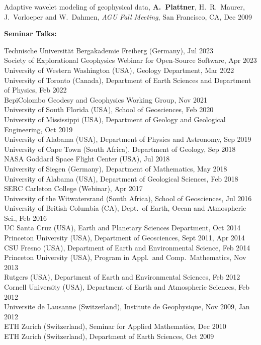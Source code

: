 \documentclass[10pt]{article}
\begin{document}
\spcp
Adaptive wavelet modeling of geophysical data,
\textbf{A.~Plattner}, H.~R.~Maurer, J.~Vorloeper and W.~Dahmen, 
\emph{AGU Fall Meeting}, San Francisco, CA, Dec 2009




\spc
\textbf{\tsize Seminar Talks:}

\spcp
Technische Universität Bergakademie Freiberg (Germany), Jul 2023\\
Society of Explorational Geophysics Webinar for Open-Source Software, Apr 2023\\
University of Western Washington (USA), Geology Department, Mar 2022\\
University of Toronto (Canada), Department of Earth Sciences and Department of Physics, Feb 2022\\
BepiColombo Geodesy and Geophysics Working Group, Nov 2021\\
University of South Florida (USA), School of Geosciences, Feb 2020\\
University of Mississippi (USA), Department of Geology and Geological Engineering, Oct 2019\\
University of Alabama (USA), Department of Physics and Astronomy, Sep 2019\\
University of Cape Town (South Africa), Department of Geology, Sep 2018\\
NASA Goddard Space Flight Center (USA), Jul 2018\\
University of Siegen (Germany), Department of Mathematics, May 2018\\
University of Alabama (USA), Department of Geological Sciences, Feb 2018\\
SERC Carleton College (Webinar), Apr 2017\\
University of the Witwatersrand (South Africa), School of Geosciences, Jul 2016\\
University of British Columbia (CA), Dept.~of Earth, Ocean and Atmospheric Sci., Feb 2016\\
UC Santa Cruz (USA), Earth and Planetary Sciences Department, Oct 2014\\
Princeton University (USA), Department of Geosciences, Sept  2011, Apr 2014\\
CSU Fresno (USA), Department of Earth and Environmental Science, Feb 2014\\
Princeton University (USA), Program in Appl.~and Comp.~Mathematics, Nov 2013\\
Rutgers (USA), Department of Earth and Environmental Sciences, Feb 2012\\
Cornell University (USA), Department of Earth and Atmospheric Sciences, Feb 2012\\
Universite de Lausanne (Switzerland), Institute de Geophysique, Nov 2009, Jan 2012\\
ETH Zurich (Switzerland), Seminar for Applied Mathematics, Dec 2010\\
ETH Zurich (Switzerland), Department of Earth Sciences, Oct 2009
\end{document}
